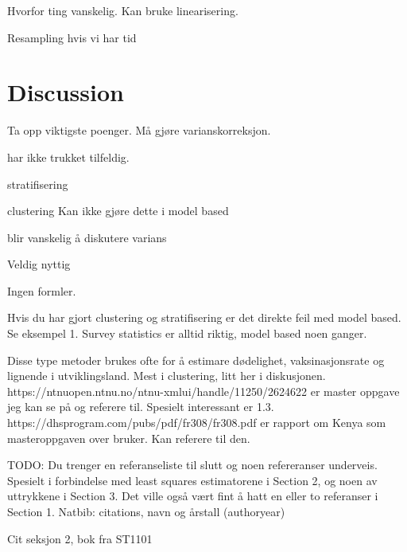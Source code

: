 \documentclass{article}
\begin{document}
Hvorfor ting vanskelig.
Kan bruke linearisering.

Resampling hvis vi har tid

\section{Discussion}
Ta opp viktigste poenger.
Må gjøre varianskorreksjon.

har ikke trukket tilfeldig.

stratifisering

clustering
  Kan ikke gjøre dette i model based

blir vanskelig å diskutere varians

Veldig nyttig

Ingen formler.

Hvis du har gjort clustering og stratifisering er det direkte feil med model
based. Se eksempel 1. Survey statistics er alltid riktig, model based noen ganger.

Disse type metoder brukes ofte for å estimare dødelighet, vaksinasjonsrate og
lignende i utviklingsland. Mest i clustering, litt her i diskusjonen.
https://ntnuopen.ntnu.no/ntnu-xmlui/handle/11250/2624622 er master oppgave jeg
kan se på og referere til. Spesielt interessant er 1.3.
https://dhsprogram.com/pubs/pdf/fr308/fr308.pdf er rapport om Kenya som
masteroppgaven over bruker. Kan referere til den.

TODO: Du trenger en referanseliste til slutt og noen refereranser underveis. Spesielt i forbindelse med least squares estimatorene i Section 2, og noen av uttrykkene i Section 3. Det ville også vært fint å hatt en eller to referanser i Section 1.
Natbib: citations, navn og årstall (authoryear)

Cit seksjon 2, bok fra ST1101
\end{document}
